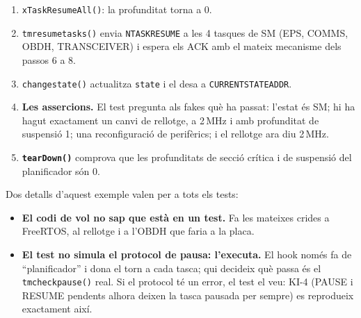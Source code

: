 \documentclass[11pt,a4paper]{article}
\DeclareRobustCommand{\_}{\textunderscore\allowbreak}
\newcommand{\cd}[1]{\texttt{#1}}
\begin{document}
\begin{enumerate}[label=\textbf{\arabic*.}]
  moment del canvi.
\item \cd{xTaskResumeAll()}: la profunditat torna a 0.
\item \cd{tm\_resume\_tasks()} envia \cd{N\_TASK\_RESUME} a les 4 tasques de SM (EPS, COMMS,
  OBDH, TRANSCEIVER) i espera els ACK amb el mateix mecanisme dels passos 6 a 8.
\item \cd{change\_state()} actualitza \cd{state} i el desa a \cd{CURRENT\_STATE\_ADDR}.
\item \textbf{Les assercions.} El test pregunta als fakes què ha passat: l'estat és SM;
  hi ha hagut exactament un canvi de rellotge, a 2\,MHz i amb profunditat de suspensió 1;
  una reconfiguració de perifèrics; i el rellotge ara diu 2\,MHz.
\item \textbf{\cd{tearDown()}} comprova que les profunditats de secció crítica i de
  suspensió del planificador són 0.
\end{enumerate}

Dos detalls d'aquest exemple valen per a tots els tests:
\begin{itemize}
\item \textbf{El codi de vol no sap que està en un test.} Fa les mateixes crides a
  FreeRTOS, al rellotge i a l'OBDH que faria a la placa.
\item \textbf{El test no simula el protocol de pausa: l'executa.} El hook només fa de
  ``planificador'' i dona el torn a cada tasca; qui decideix què passa és el
  \cd{tm\_check\_pause()} real. Si el protocol té un error, el test el veu: KI-4 (PAUSE i
  RESUME pendents alhora deixen la tasca pausada per sempre) es reprodueix exactament així.
\end{itemize}
\end{document}
